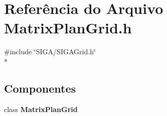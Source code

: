 \section{Referência do Arquivo Matrix\+Plan\+Grid.\+h}
\label{_matrix_plan_grid_8h}
{\ttfamily \#include \char`\"{}S\+I\+G\+A/\+S\+I\+G\+A\+Grid.\+h\char`\"{}}\\*
\subsection*{Componentes}
\begin{DoxyCompactItemize}
\item 
class {\bf Matrix\+Plan\+Grid}
\end{DoxyCompactItemize}
